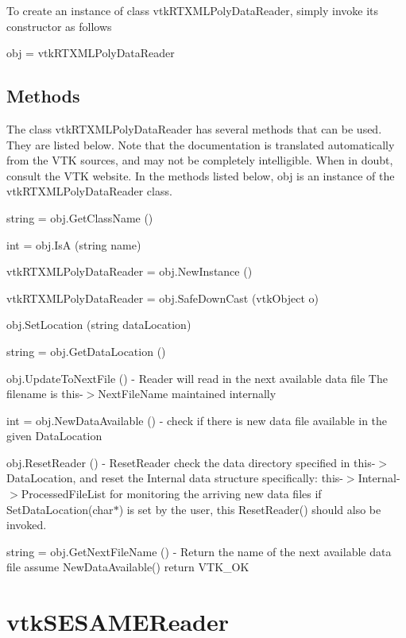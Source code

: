 To create an instance of class vtk\-R\-T\-X\-M\-L\-Poly\-Data\-Reader, simply invoke its constructor as follows \begin{DoxyVerb}  obj = vtkRTXMLPolyDataReader
\end{DoxyVerb}
 \hypertarget{vtkwidgets_vtkxyplotwidget_Methods}{}\subsection{Methods}\label{vtkwidgets_vtkxyplotwidget_Methods}
The class vtk\-R\-T\-X\-M\-L\-Poly\-Data\-Reader has several methods that can be used. They are listed below. Note that the documentation is translated automatically from the V\-T\-K sources, and may not be completely intelligible. When in doubt, consult the V\-T\-K website. In the methods listed below, {\ttfamily obj} is an instance of the vtk\-R\-T\-X\-M\-L\-Poly\-Data\-Reader class. 
\begin{DoxyItemize}
\item {\ttfamily string = obj.\-Get\-Class\-Name ()}  
\item {\ttfamily int = obj.\-Is\-A (string name)}  
\item {\ttfamily vtk\-R\-T\-X\-M\-L\-Poly\-Data\-Reader = obj.\-New\-Instance ()}  
\item {\ttfamily vtk\-R\-T\-X\-M\-L\-Poly\-Data\-Reader = obj.\-Safe\-Down\-Cast (vtk\-Object o)}  
\item {\ttfamily obj.\-Set\-Location (string data\-Location)}  
\item {\ttfamily string = obj.\-Get\-Data\-Location ()}  
\item {\ttfamily obj.\-Update\-To\-Next\-File ()} -\/ Reader will read in the next available data file The filename is this-\/$>$Next\-File\-Name maintained internally  
\item {\ttfamily int = obj.\-New\-Data\-Available ()} -\/ check if there is new data file available in the given Data\-Location  
\item {\ttfamily obj.\-Reset\-Reader ()} -\/ Reset\-Reader check the data directory specified in this-\/$>$Data\-Location, and reset the Internal data structure specifically\-: this-\/$>$Internal-\/$>$Processed\-File\-List for monitoring the arriving new data files if Set\-Data\-Location(char$\ast$) is set by the user, this Reset\-Reader() should also be invoked.  
\item {\ttfamily string = obj.\-Get\-Next\-File\-Name ()} -\/ Return the name of the next available data file assume New\-Data\-Available() return V\-T\-K\-\_\-\-O\-K  
\end{DoxyItemize}\hypertarget{vtkio_vtksesamereader}{}\section{vtk\-S\-E\-S\-A\-M\-E\-Reader}\label{vtkio_vtksesamereader}
